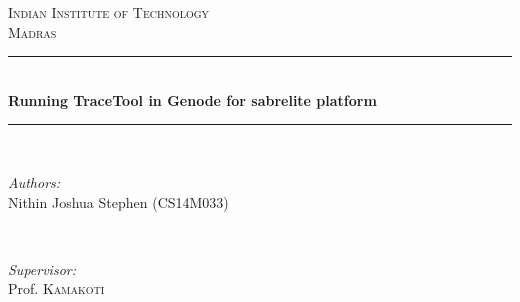 \documentclass[12pt]{article}
\date{}
\theoremstyle{plain}
\begin{document}
\begin{titlepage}

\newcommand{\HRule}{\rule{\linewidth}{0.5mm}} %

\center %
 

\textsc{\LARGE Indian Institute of Technology} \\[0.5cm]
\textsc{\LARGE Madras}\\[1cm] %


\HRule \\[0.4cm]
{ \LARGE \bfseries Running TraceTool in Genode for sabrelite platform}\\[0.4cm] %
\HRule \\[1.5cm]
 

\begin{minipage}{0.4\textwidth}
\begin{flushleft} \large
\emph{Authors:}\\
Nithin Joshua Stephen (CS14M033) %
\end{flushleft}
\end{minipage}
~
\begin{minipage}{0.5\textwidth}
\begin{flushright} \large
\emph{Supervisor:} \\
Prof.  \textsc{Kamakoti} %
\end{flushright}
\end{minipage}\\[2cm]


\end{titlepage}
\end{document}
